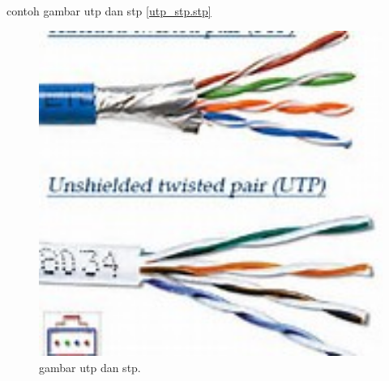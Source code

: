 	contoh gambar utp dan stp \ref{utp_stp.stp}
	\begin{figure}[ht]
		\centerline{\includegraphics[width=1\textwidth]{figures/utp_stp.jpg}}
		\caption{gambar utp dan stp.}
		\label{utp_stp}
	\end{figure}

